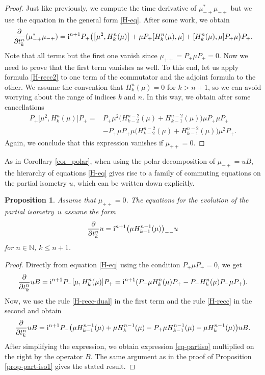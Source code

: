 \documentclass[pdftex]{sigma}
\newtheorem{prop}[thm]{Proposition}
\theoremstyle{definition}
\numberwithin{equation}{section}
\newcommand{\N}{\mathbb N}
\newcommand{\be}{\begin{equation}}
\newcommand{\ee}{\end{equation}}
\begin{document}
\begin{proof}
Just like previously, we compute
the time derivative of $\mu_{-+}^*\mu_{-+}$ but we use the equation in the general form \eqref{H-eq}. After some work, we obtain
\[
 \frac\partial{\partial t^n_k} (\mu_{-+}^*\mu_{-+}) = {\rm i}^{n+1}P_+\bigl(\bigl[\mu^2,H_k^n(\mu)\bigr] +
\mu P_+ [H^n_k(\mu),\mu] +
[H^n_k(\mu),\mu] P_+ \mu\bigr) P_+.
\]
Note that all terms but the first one vanish since $\mu_{++}=P_+\mu P_+=0$. Now we need to prove that the first term vanishes as well. To this end, let us apply formula \eqref{H-recc2} to one term of the commutator and the adjoint formula
to the other. We assume the convention that $H_k^n(\mu)=0$ for $k>n+1$, so we can avoid worrying about the range of indices $k$ and $n$. In this way, we obtain after some cancellations
\begin{align*}
 P_+\bigl[\mu^2,H_k^n(\mu)\bigr]P_+ ={}&
P_+ \mu^2 \bigl(H^{n-2}_{k-2}(\mu) + H^{n-2}_{k-1}(\mu)\bigr) \mu P_+ \mu P_+\\
& -
P_+ \mu P_+ \mu \bigl(H^{n-2}_{k-2}(\mu) + H^{n-2}_{k-1}(\mu)\bigr) \mu^2 P_+ .
\end{align*}
Again, we conclude that this expression vanishes if $\mu_{++}=0$.
\end{proof}

As in Corollary \ref{cor_polar}, when using the polar decomposition of $\mu_{-+}=uB$, the hierarchy of equations \eqref{H-eq} gives rise to a family of commuting equations on the partial isometry $u$, which can be written down explicitly.

\begin{prop}
Assume that $\mu_{++} = 0$.
The equations for the evolution of the partial isometry~$u$ assume the form
\be \label{eq-partiso} \frac\partial{\partial t^n_k} u = {\rm i}^{n+1}\bigl(\mu H^{n-1}_{k-1}(\mu)\bigr)_{--}u\ee
for $n\in\N$, $k\leq n+1$.
\end{prop}
\begin{proof}
Directly from equation \eqref{H-eq} using the condition $P_+ \mu P_+ = 0$, we get
\[
 \frac\partial{\partial t^n_k} uB = {\rm i}^{n+1}P_-[\mu, H^n_k(\mu)]P_+ =
{\rm i}^{n+1}(P_-\mu H^n_k(\mu) P_+ - P_- H^n_k(\mu) P_- \mu P_+).\]
Now, we use the rule \eqref{H-recc-dual} in the first term and the rule \eqref{H-recc} in the second and obtain
\[
 \frac\partial{\partial t^n_k} uB = {\rm i}^{n+1}P_-\bigl(\mu H^{n-1}_{k-1}(\mu) + \mu H^{n-1}_{k}(\mu)
-P_+\mu H^{n-1}_{k-1}(\mu) - \mu H^{n-1}_k(\mu)\bigr)uB.\]
After simplifying the expression, we obtain expression \eqref{eq-partiso} multiplied on the right by the operator $B$. The same argument as in the proof of Proposition \ref{prop-part-iso1} gives the stated result.
\end{proof}
\end{document}
